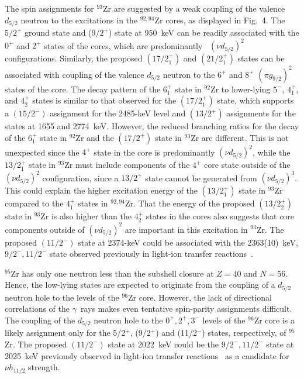 The spin assignments for $^{93}$Zr are suggested by a weak coupling 
of the valence $d_{5/2}$ neutron to the excitations in the 
$^{92,94}$Zr cores, as displayed in Fig.~4.  The $5/2^+$ ground state 
and ($9/2^+$) state at 950~keV can be readily associated with the 
$0^+$ and $2^+$ states of the cores, which are 
predominantly~\cite{Cha} $(\nu d_{5/2})^2$ configurations.  
Similarly, the proposed $(17/2^+_1)$ and $(21/2^+_1)$ states 
can be associated with coupling of the valence $d_{5/2}$ neutron 
to the $6^+$ and $8^+$ $(\pi g_{9/2})^2$ states of the core.  
The decay pattern of the $6_1^+$ state in $^{92}$Zr to 
lower-lying $5^-$, $4_1^+$, and $4_2^+$ states is similar 
to that observed for the $(17/2_1^+)$ state, which supports a 
$(15/2^-)$ assignment for the 2485-keV level and $(13/2^+)$ 
assignments for the states at 1655 and 2774~keV.  
However, the reduced branching ratios for the decay of the 
$6_1^+$ state in $^{92}$Zr and the $(17/2^+)$ state in $^{93}$Zr 
are different.  This is not unexpected 
since the $4^+$ state in the core is predominantly 
$(\nu d_{5/2})^2$, while the $13/2_1^+$ state in $^{93}$Zr 
must include components of the $4^+$ core state outside of the 
$(\nu d_{5/2})^2$ configuration, since a $13/2^+$ state cannot 
be generated from $(\nu d_{5/2})^3$.  This could explain the 
higher excitation energy of the $(13/2_1^+)$ state in $^{93}$Zr 
compared to the $4_1^+$ states in $^{92,94}$Zr.  
That the energy of the proposed $(13/2_2^+)$ state in 
$^{93}$Zr is also higher than the $4_2^+$ states in the cores 
also suggests that core components outside of $(\nu d_{5/2})^2$ 
are important in this excitation in $^{93}$Zr.  
The proposed $(11/2^-)$ state at 2374-keV could be associated 
with the 2363(10)~keV, $9/2^-,11/2^-$ state observed previously in 
light-ion transfer reactions~\cite{NDS3}.  

$^{95}$Zr has only one neutron less than the subshell closure at 
$Z=40$ and $N=56$. Hence, the low-lying states are expected 
to originate from the coupling of a $d_{5/2}$ neutron hole 
to the levels of the $^{96}$Zr core. However, the lack of 
directional correlations of the $\gamma$~rays makes even 
tentative spin-parity assignments difficult. The coupling of 
the $d_{5/2}$ neutron hole to the $0^+, 2^+, 3^-$ levels of the 
$^{96}$Zr core is a likely assignment only for the 
5/2$^{+}$, (9/2$^{+}$) and (11/2$^{-}$) states, respectively, of $^{95}$Zr.  
The proposed $(11/2^-)$ state at 2022~keV could be the 
$9/2^-,11/2^-$ state at 2025~keV previously observed in 
light-ion transfer reactions~\cite{NDS5} as a candidate for 
$\nu h_{11/2}$ strength.

